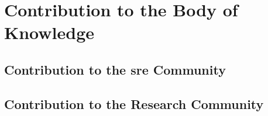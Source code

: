 \section{Contribution to the Body of Knowledge}

\subsection{Contribution to the \ac{sre} Community}

\subsection{Contribution to the Research Community}